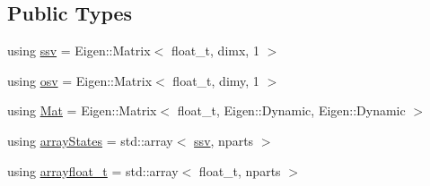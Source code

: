 \subsection*{Public Types}
\begin{DoxyCompactItemize}
\item 
using \hyperlink{classSISRFilter_abfec45cf57ea6fadae4a9da8b0042351}{ssv} = Eigen\+::\+Matrix$<$ float\+\_\+t, dimx, 1 $>$
\item 
using \hyperlink{classSISRFilter_a5b762e9352857a9e48db3932191887ef}{osv} = Eigen\+::\+Matrix$<$ float\+\_\+t, dimy, 1 $>$
\item 
using \hyperlink{classSISRFilter_a7355e966778c788dfe227ef5254677c4}{Mat} = Eigen\+::\+Matrix$<$ float\+\_\+t, Eigen\+::\+Dynamic, Eigen\+::\+Dynamic $>$
\item 
using \hyperlink{classSISRFilter_a5c8a38ceb31c22f3c3f38b0ead5c1ce7}{array\+States} = std\+::array$<$ \hyperlink{classSISRFilter_abfec45cf57ea6fadae4a9da8b0042351}{ssv}, nparts $>$
\item 
using \hyperlink{classSISRFilter_a35f5a590324bd78fc4f6ded236937ac2}{arrayfloat\+\_\+t} = std\+::array$<$ float\+\_\+t, nparts $>$
\end{DoxyCompactItemize}
